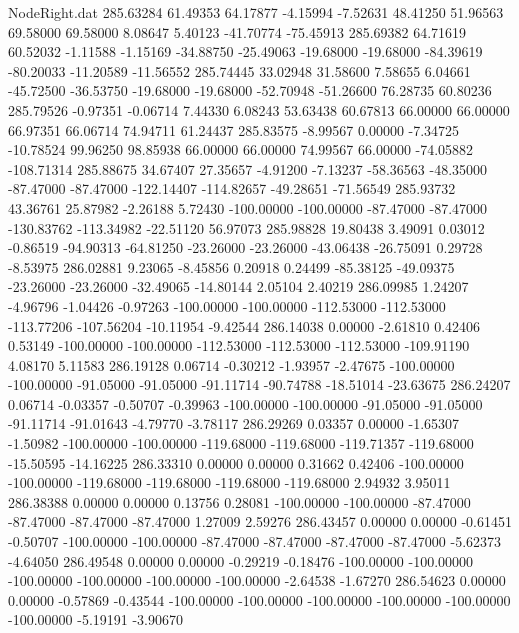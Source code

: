 \begin{filecontents}{NodeRight.dat}
 285.63284   61.49353   64.17877    -4.15994   -7.52631   48.41250   51.96563   69.58000   69.58000    8.08647    5.40123  -41.70774  -75.45913
 285.69382   64.71619   60.52032    -1.11588   -1.15169  -34.88750  -25.49063  -19.68000  -19.68000  -84.39619  -80.20033  -11.20589  -11.56552
 285.74445   33.02948   31.58600     7.58655    6.04661  -45.72500  -36.53750  -19.68000  -19.68000  -52.70948  -51.26600   76.28735   60.80236
 285.79526   -0.97351   -0.06714     7.44330    6.08243   53.63438   60.67813   66.00000   66.00000   66.97351   66.06714   74.94711   61.24437
 285.83575   -8.99567    0.00000    -7.34725  -10.78524   99.96250   98.85938   66.00000   66.00000   74.99567   66.00000  -74.05882 -108.71314
 285.88675   34.67407   27.35657    -4.91200   -7.13237  -58.36563  -48.35000  -87.47000  -87.47000 -122.14407 -114.82657  -49.28651  -71.56549
 285.93732   43.36761   25.87982    -2.26188    5.72430 -100.00000 -100.00000  -87.47000  -87.47000 -130.83762 -113.34982  -22.51120   56.97073
 285.98828   19.80438    3.49091     0.03012   -0.86519  -94.90313  -64.81250  -23.26000  -23.26000  -43.06438  -26.75091    0.29728   -8.53975
 286.02881    9.23065   -8.45856     0.20918    0.24499  -85.38125  -49.09375  -23.26000  -23.26000  -32.49065  -14.80144    2.05104    2.40219
 286.09985    1.24207   -4.96796    -1.04426   -0.97263 -100.00000 -100.00000 -112.53000 -112.53000 -113.77206 -107.56204  -10.11954   -9.42544
 286.14038    0.00000   -2.61810     0.42406    0.53149 -100.00000 -100.00000 -112.53000 -112.53000 -112.53000 -109.91190    4.08170    5.11583
 286.19128    0.06714   -0.30212    -1.93957   -2.47675 -100.00000 -100.00000  -91.05000  -91.05000  -91.11714  -90.74788  -18.51014  -23.63675
 286.24207    0.06714   -0.03357    -0.50707   -0.39963 -100.00000 -100.00000  -91.05000  -91.05000  -91.11714  -91.01643   -4.79770   -3.78117
 286.29269    0.03357    0.00000    -1.65307   -1.50982 -100.00000 -100.00000 -119.68000 -119.68000 -119.71357 -119.68000  -15.50595  -14.16225
 286.33310    0.00000    0.00000     0.31662    0.42406 -100.00000 -100.00000 -119.68000 -119.68000 -119.68000 -119.68000    2.94932    3.95011
 286.38388    0.00000    0.00000     0.13756    0.28081 -100.00000 -100.00000  -87.47000  -87.47000  -87.47000  -87.47000    1.27009    2.59276
 286.43457    0.00000    0.00000    -0.61451   -0.50707 -100.00000 -100.00000  -87.47000  -87.47000  -87.47000  -87.47000   -5.62373   -4.64050
 286.49548    0.00000    0.00000    -0.29219   -0.18476 -100.00000 -100.00000 -100.00000 -100.00000 -100.00000 -100.00000   -2.64538   -1.67270
 286.54623    0.00000    0.00000    -0.57869   -0.43544 -100.00000 -100.00000 -100.00000 -100.00000 -100.00000 -100.00000   -5.19191   -3.90670

\end{filecontents}
